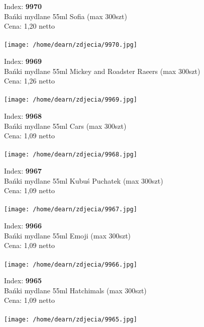 {Index: \textbf{9970}\\
Bańki mydlane 55ml Sofia (max 300szt)\\
Cena: 1,20 netto   \\\\  \texttt{[image: /home/dearn/zdjecia/9970.jpg]}}\newline\newline

{Index: \textbf{9969}\\
Bańki mydlane 55ml Mickey and Roadster Raeers (max 300szt)\\
Cena: 1,26 netto   \\\\  \texttt{[image: /home/dearn/zdjecia/9969.jpg]}}\newline\newline

{Index: \textbf{9968}\\
Bańki mydlane 55ml Cars (max 300szt)\\
Cena: 1,09 netto   \\\\  \texttt{[image: /home/dearn/zdjecia/9968.jpg]}}\newline\newline

{Index: \textbf{9967}\\
Bańki mydlane 55ml Kubuś Puchatek (max 300szt)\\
Cena: 1,09 netto   \\\\  \texttt{[image: /home/dearn/zdjecia/9967.jpg]}}\newline\newline

{Index: \textbf{9966}\\
Bańki mydlane 55ml Emoji (max 300szt)\\
Cena: 1,09 netto   \\\\  \texttt{[image: /home/dearn/zdjecia/9966.jpg]}}\newline\newline

{Index: \textbf{9965}\\
Bańki mydlane 55ml Hatchimals (max 300szt)\\
Cena: 1,09 netto   \\\\  \texttt{[image: /home/dearn/zdjecia/9965.jpg]}}\newline\newline
